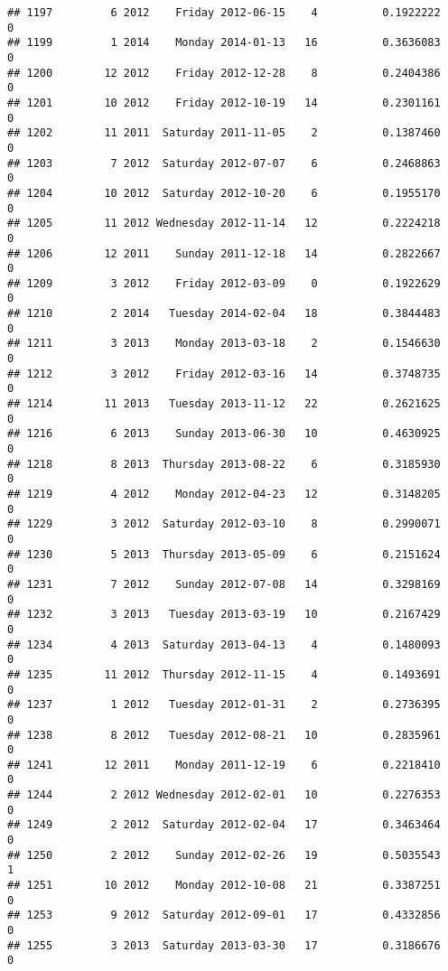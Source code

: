 \documentclass[
]{article}
\begin{document}
\begin{verbatim}
## 1197         6 2012    Friday 2012-06-15    4          0.1922222             0
## 1199         1 2014    Monday 2014-01-13   16          0.3636083             0
## 1200        12 2012    Friday 2012-12-28    8          0.2404386             0
## 1201        10 2012    Friday 2012-10-19   14          0.2301161             0
## 1202        11 2011  Saturday 2011-11-05    2          0.1387460             0
## 1203         7 2012  Saturday 2012-07-07    6          0.2468863             0
## 1204        10 2012  Saturday 2012-10-20    6          0.1955170             0
## 1205        11 2012 Wednesday 2012-11-14   12          0.2224218             0
## 1206        12 2011    Sunday 2011-12-18   14          0.2822667             0
## 1209         3 2012    Friday 2012-03-09    0          0.1922629             0
## 1210         2 2014   Tuesday 2014-02-04   18          0.3844483             0
## 1211         3 2013    Monday 2013-03-18    2          0.1546630             0
## 1212         3 2012    Friday 2012-03-16   14          0.3748735             0
## 1214        11 2013   Tuesday 2013-11-12   22          0.2621625             0
## 1216         6 2013    Sunday 2013-06-30   10          0.4630925             0
## 1218         8 2013  Thursday 2013-08-22    6          0.3185930             0
## 1219         4 2012    Monday 2012-04-23   12          0.3148205             0
## 1229         3 2012  Saturday 2012-03-10    8          0.2990071             0
## 1230         5 2013  Thursday 2013-05-09    6          0.2151624             0
## 1231         7 2012    Sunday 2012-07-08   14          0.3298169             0
## 1232         3 2013   Tuesday 2013-03-19   10          0.2167429             0
## 1234         4 2013  Saturday 2013-04-13    4          0.1480093             0
## 1235        11 2012  Thursday 2012-11-15    4          0.1493691             0
## 1237         1 2012   Tuesday 2012-01-31    2          0.2736395             0
## 1238         8 2012   Tuesday 2012-08-21   10          0.2835961             0
## 1241        12 2011    Monday 2011-12-19    6          0.2218410             0
## 1244         2 2012 Wednesday 2012-02-01   10          0.2276353             0
## 1249         2 2012  Saturday 2012-02-04   17          0.3463464             0
## 1250         2 2012    Sunday 2012-02-26   19          0.5035543             1
## 1251        10 2012    Monday 2012-10-08   21          0.3387251             0
## 1253         9 2012  Saturday 2012-09-01   17          0.4332856             0
## 1255         3 2013  Saturday 2013-03-30   17          0.3186676             0

\end{verbatim}
\end{document}
